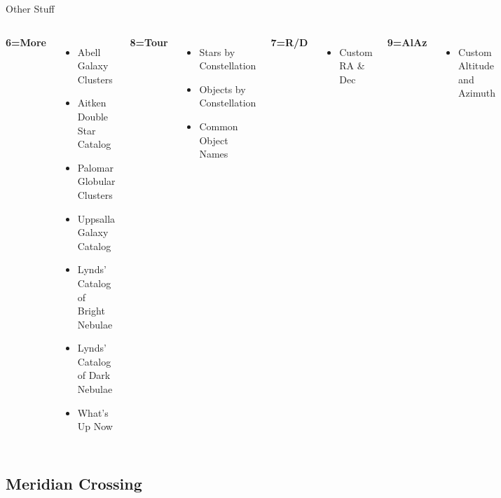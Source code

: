 \begin{frame}[t]{Other Stuff}
\begin{columns}[T]
  \textbf{6=More}
    \begin{itemize}
    \item Abell Galaxy Clusters
    \item Aitken Double Star Catalog
    \item Palomar Globular Clusters
    \item Uppsalla Galaxy Catalog
    \item Lynds’ Catalog of Bright Nebulae
    \item Lynds’ Catalog of Dark Nebulae
    \item What’s Up Now
    \end{itemize}

  \textbf{8=Tour}
    \begin{itemize}
    \item Stars by Constellation
    \item Objects by Constellation
    \item Common Object Names
    \end{itemize}

  \textbf{7=R/D}
    \begin{itemize}
    \item Custom RA \& Dec
    \end{itemize}

  \textbf{9=AlAz}
    \begin{itemize}
    \item Custom Altitude and Azimuth
    \end{itemize}
\end{columns}
\end{frame}

\subsection{Meridian Crossing}

